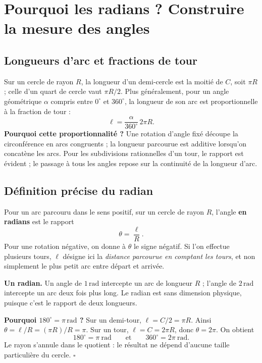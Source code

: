 \documentclass[../cours_spe_trigo.tex]{subfiles}
\begin{document}
\setcounter{chapter}{2}
\chapter{Pourquoi les radians ? Construire la mesure des angles}
\section{Longueurs d'arc et fractions de tour}
Sur un cercle de rayon $R$, la longueur d'un demi-cercle est la moitié de $C$, soit $\pi R$ ; celle d'un quart de cercle vaut $\pi R/2$. Plus généralement, pour un angle géométrique $\alpha$ compris entre $0^\circ$ et $360^\circ$, la longueur de son arc est proportionnelle à la fraction de tour :
\[
\ell=\frac{\alpha}{360^\circ}\,2\pi R.
\]
\textbf{Pourquoi cette proportionnalité ?} Une rotation d'angle fixé découpe la circonférence en arcs congruents ; la longueur parcourue est additive lorsqu'on concatène les arcs. Pour les subdivisions rationnelles d'un tour, le rapport est évident ; le passage à tous les angles repose sur la continuité de la longueur d'arc.

\section{Définition précise du radian}
\begin{definition}
Pour un arc parcouru dans le sens positif, sur un cercle de rayon $R$, l'angle \textbf{en radians} est le rapport
\[\boxed{\theta=\frac{\ell}{R}.}\]
Pour une rotation négative, on donne à $\theta$ le signe négatif. Si l'on effectue plusieurs tours, $\ell$ désigne ici la \emph{distance parcourue en comptant les tours}, et non simplement le plus petit arc entre départ et arrivée.
\end{definition}
\textbf{Un radian.} Un angle de $1\,\mathrm{rad}$ intercepte un arc de longueur $R$ ; l'angle de $2\,\mathrm{rad}$ intercepte un arc deux fois plus long. Le radian est sans dimension physique, puisque c'est le rapport de deux longueurs.
\begin{demonstration}
\textbf{Pourquoi $180^\circ=\pi\,\mathrm{rad}$ ?} Sur un demi-tour, $\ell=C/2=\pi R$. Ainsi $\theta=\ell/R=(\pi R)/R=\pi$. Sur un tour, $\ell=C=2\pi R$, donc $\theta=2\pi$. On obtient
\[\boxed{180^\circ=\pi\ \mathrm{rad}\qquad\text{et}\qquad360^\circ=2\pi\ \mathrm{rad}.}\]
Le rayon s'annule dans le quotient : le résultat ne dépend d'aucune taille particulière du cercle. $\square$
\end{demonstration}
\begin{center}
\end{center}
\end{document}
